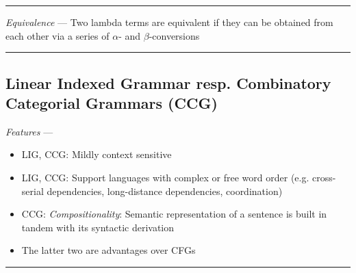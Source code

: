 {\color{lightgray}\hrule height 0.001mm}

\emph{Equivalence} --- Two lambda terms are equivalent if they can be obtained from each other via a series of $\alpha$- and $\beta$-conversions

{\color{black}\hrule height 0.001mm}

\subsection*{Linear Indexed Grammar resp. Combinatory Categorial Grammars (CCG)}
\emph{Features} --- 
\begin{itemize}
    \item LIG, CCG: Mildly context sensitive
    \item LIG, CCG: Support languages with complex or free word order (e.g. cross-serial dependencies, long-distance dependencies, coordination)
    \item CCG: \emph{Compositionality}: Semantic representation of a sentence is built in tandem with its syntactic derivation
    \item The latter two are advantages over CFGs
\end{itemize}

{\color{lightgray}\hrule height 0.001mm}

